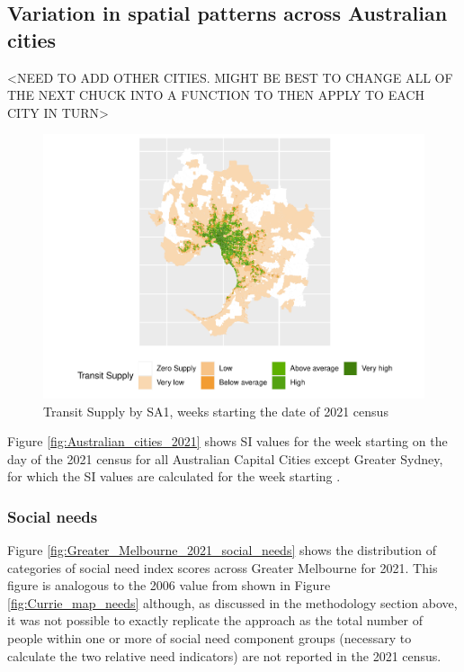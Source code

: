 \documentclass[preprint, 3p,
authoryear]{elsarticle} %
\begin{document}
\subsection{Variation in spatial patterns across Australian
cities}\label{variation-in-spatial-patterns-across-australian-cities}

\textless NEED TO ADD OTHER CITIES. MIGHT BE BEST TO CHANGE ALL OF THE
NEXT CHUCK INTO A FUNCTION TO THEN APPLY TO EACH CITY IN
TURN\textgreater{}

\begin{figure}
\centering
\includegraphics{Leveraging_GTFS_to_assess_transit_supply_Transport_Geography_files/figure-latex/Australian_cities_2021-1.pdf}
\caption{Transit Supply by SA1, weeks starting the date of 2021 census}
\end{figure}

Figure \ref{fig:Australian_cities_2021} shows SI values for the week
starting on the day of the 2021 census for all Australian Capital Cities
except Greater Sydney, for which the SI values are calculated for the
week starting .

\subsubsection{Social needs}\label{social-needs}

Figure \ref{fig:Greater_Melbourne_2021_social_needs} shows the
distribution of categories of social need index scores across Greater
Melbourne for 2021. This figure is analogous to the 2006 value from
\citet{currie2010identifying} shown in Figure \ref{fig:Currie_map_needs}
although, as discussed in the methodology section above, it was not
possible to exactly replicate the \citet{currie2010identifying} approach
as the total number of people within one or more of social need
component groups (necessary to calculate the two relative need
indicators) are not reported in the 2021 census.
\end{document}

